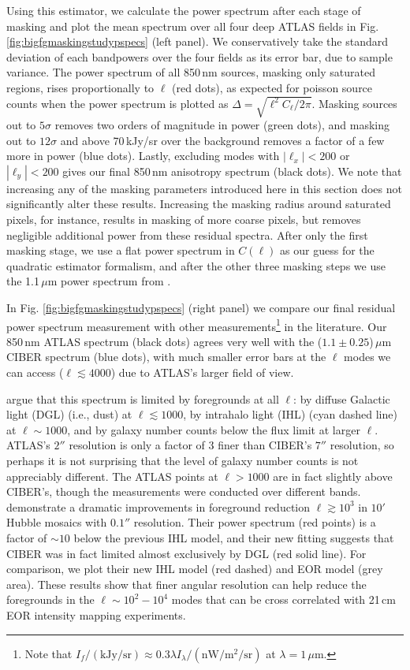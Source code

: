 \documentclass[numberedappendix]{emulateapj}
\begin{document}
Using this estimator, we calculate the power spectrum after each stage of masking and plot the mean spectrum over all four deep ATLAS fields in Fig. \ref{fig:bigfgmaskingstudypspecs} (left panel). We conservatively take the standard deviation of each bandpowers over the four fields as its error bar, due to sample variance. The power spectrum of all 850\,nm sources, masking only saturated regions, rises proportionally to $\ell$ (red dots), as expected for poisson source counts when the power spectrum is plotted as $\Delta=\sqrt{\ell^2C_\ell/2\pi}$. Masking sources out to $5\sigma$ removes two orders of magnitude in power (green dots), and masking out to $12\sigma$ and above 70\,kJy/sr over the background removes a factor of a few more in power (blue dots). Lastly, excluding modes with $|\ell_x|<200$ or $|\ell_y|<200$ gives our final 850\,nm anisotropy spectrum (black dots). We note that increasing any of the masking parameters introduced here in this section does not significantly alter these results. Increasing the masking radius around saturated pixels, for instance, results in masking of more coarse pixels, but removes negligible additional power from these residual spectra. After only the first masking stage, we use a flat power spectrum in $C(\ell)$ as our guess for the quadratic estimator formalism, and after the other three masking steps we use the 1.1\,$\mu$m power spectrum from \citet{zemcov14}.

In Fig. \ref{fig:bigfgmaskingstudypspecs} (right panel) we compare our final residual power spectrum measurement with other measurements\footnote{Note that $I_f/(\text{kJy/sr})\approx0.3\lambda I_\lambda/(\text{nW}/\text{m}^2/\text{sr})$ at $\lambda=1$\,$\mu$m.} in the literature. Our 850\,nm ATLAS spectrum (black dots) agrees very well with the ($1.1\pm0.25$)\,$\mu$m CIBER spectrum (blue dots), with much smaller error bars at the $\ell$ modes we can access ($\ell\lesssim4000$) due to ATLAS's larger field of view. 

\citet{zemcov14} argue that this spectrum is limited by foregrounds at all $\ell$: by diffuse Galactic light (DGL) (i.e., dust) at $\ell\lesssim1000$, by intrahalo light (IHL) (cyan dashed line) at $\ell\sim1000$, and by galaxy number counts below the flux limit at larger $\ell$. ATLAS's $2''$ resolution is only a factor of 3 finer than CIBER's $7''$ resolution, so perhaps it is not surprising that the level of galaxy number counts is not appreciably different. The ATLAS points at $\ell>1000$ are in fact slightly above CIBER's, though the measurements were conducted over different bands. \citet{mw15} demonstrate a dramatic improvements in foreground reduction $\ell\gtrsim10^3$ in $10'$ Hubble mosaics with $0.1''$ resolution. Their power spectrum (red points) is a factor of $\sim10$ below the previous IHL model, and their new fitting suggests that CIBER was in fact limited almost exclusively by DGL (red solid line). For comparison, we plot their new IHL model (red dashed) and EOR model (grey area). These results show that finer angular resolution can help reduce the foregrounds in the $\ell\sim10^2-10^4$ modes that can be cross correlated with 21\,cm EOR intensity mapping experiments. 
\end{document}
